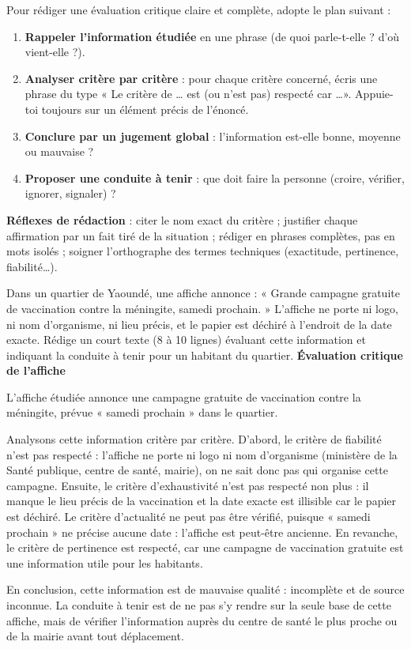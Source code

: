 \documentclass[11pt]{article}
\begin{document}
\begin{methode}
Pour rédiger une évaluation critique claire et complète, adopte le plan suivant :
\begin{enumerate}
\item \textbf{Rappeler l'information étudiée} en une phrase (de quoi parle-t-elle ? d'où vient-elle ?).
\item \textbf{Analyser critère par critère} : pour chaque critère concerné, écris une phrase du type « Le critère de \ldots{} est (ou n'est pas) respecté car \ldots ». Appuie-toi toujours sur un élément précis de l'énoncé.
\item \textbf{Conclure par un jugement global} : l'information est-elle bonne, moyenne ou mauvaise ?
\item \textbf{Proposer une conduite à tenir} : que doit faire la personne (croire, vérifier, ignorer, signaler) ?
\end{enumerate}
\textbf{Réflexes de rédaction} : citer le nom exact du critère ; justifier chaque affirmation par un fait tiré de la situation ; rédiger en phrases complètes, pas en mots isolés ; soigner l'orthographe des termes techniques (exactitude, pertinence, fiabilité\ldots).
\end{methode}

\begin{exoresolu}
Dans un quartier de Yaoundé, une affiche annonce : « Grande campagne gratuite de vaccination contre la méningite, samedi prochain. » L'affiche ne porte ni logo, ni nom d'organisme, ni lieu précis, et le papier est déchiré à l'endroit de la date exacte. Rédige un court texte (8 à 10 lignes) évaluant cette information et indiquant la conduite à tenir pour un habitant du quartier.
\tcblower
\textbf{Évaluation critique de l'affiche}

L'affiche étudiée annonce une campagne gratuite de vaccination contre la méningite, prévue « samedi prochain » dans le quartier.

Analysons cette information critère par critère. D'abord, le critère de fiabilité n'est pas respecté : l'affiche ne porte ni logo ni nom d'organisme (ministère de la Santé publique, centre de santé, mairie), on ne sait donc pas qui organise cette campagne. Ensuite, le critère d'exhaustivité n'est pas respecté non plus : il manque le lieu précis de la vaccination et la date exacte est illisible car le papier est déchiré. Le critère d'actualité ne peut pas être vérifié, puisque « samedi prochain » ne précise aucune date : l'affiche est peut-être ancienne. En revanche, le critère de pertinence est respecté, car une campagne de vaccination gratuite est une information utile pour les habitants.

En conclusion, cette information est de mauvaise qualité : incomplète et de source inconnue. La conduite à tenir est de ne pas s'y rendre sur la seule base de cette affiche, mais de vérifier l'information auprès du centre de santé le plus proche ou de la mairie avant tout déplacement.
\end{exoresolu}
\end{document}
